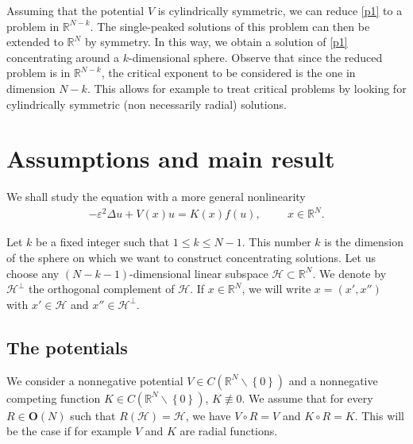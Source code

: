 \documentclass[a4paper]{amsart}
\begin{document}
Assuming that the potential $V$ is cylindrically symmetric, we can reduce \eqref{p1} to a problem in ${\mathbb{R}}^{N-k}$. The
single-peaked solutions of this problem can then be extended to ${\mathbb{R}}^N$ by symmetry. In this way, we obtain a solution of
\eqref{p1} concentrating around a $k$-dimensional sphere. Observe that since the reduced problem is in ${\mathbb{R}}^{N-k}$, the
critical exponent to be considered is the one in dimension $N-k$. This allows for example to treat critical problems by
looking for cylindrically symmetric (non necessarily radial) solutions.

\section{Assumptions and main result}
We shall study the equation with a more general nonlinearity
\begin{align}\label{p1f}
 - \varepsilon^2 \Delta u + V(x)u = K(x)f(u), \hspace{1cm}  x \in {\mathbb{R}}^N.
\end{align}

Let $k$ be a fixed integer such that $1 \leq k \leq N-1$. This number $k$ is the dimension of the
sphere on which we want to construct concentrating solutions. Let us choose any
$(N-k-1)$-dimensional linear subspace $\mathcal{H} \subset {\mathbb{R}}^N$. We denote by $\mathcal{H}^{\bot}$
the orthogonal complement of $\mathcal{H}$. If $x \in {\mathbb{R}}^N$, we will write $x = (x',x'')$ with $x'
\in \mathcal{H}$ and $x'' \in \mathcal{H}^{\bot}$.

\subsection{The potentials}
We consider a nonnegative potential $V \in C({\mathbb{R}}^N \backslash \left\{ 0 \right\})$ and a nonnegative competing function
$K \in C({\mathbb{R}}^N \backslash \left\{ 0 \right\})$, $K \not\equiv 0$. 
We assume that for every $R \in \mathbf{O}(N)$ such that $R(\mathcal{H})=\mathcal{H}$, we have $V \circ R = V$ and $K \circ R = K$. This will be the case if for example $V$ and $K$ are radial functions.
\end{document}
